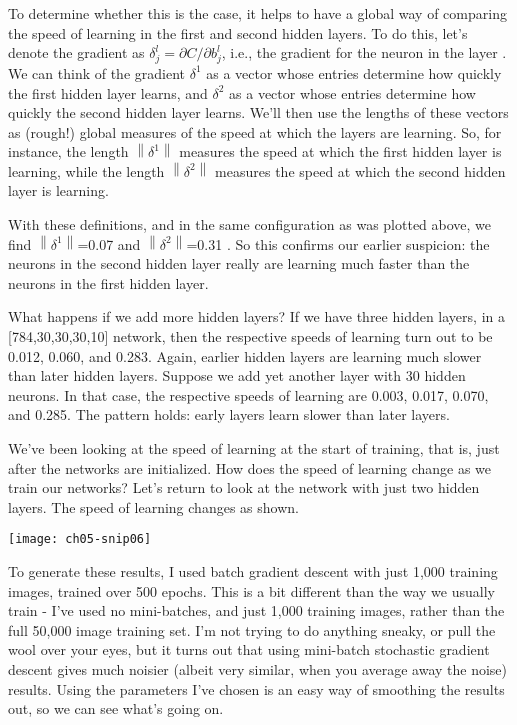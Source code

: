 To determine whether this is the case, it helps to have a global way of comparing the speed of learning in the first and second hidden layers. To do this, let's denote the gradient as $\delta_{j}^{l}=\partial C / \partial b_{j}^{l}$, i.e., the gradient for the  neuron in the  layer
. 
We can think of the gradient $\delta^{1}$ as a vector whose entries determine how quickly the first hidden layer learns, and $\delta^{2}$ as a vector whose entries determine how quickly the second hidden layer learns. We'll then use the lengths of these vectors as (rough!) global measures of the speed at which the layers are learning. So, for instance, the length $\left\|\delta^{1}\right\|$ measures the speed at which the first hidden layer is learning, while the length $\left\|\delta^{2}\right\|$ measures the speed at which the second hidden layer is learning.


With these definitions, and in the same configuration as was plotted above, we find $\left\|\delta^{1}\right\|$=0.07 and $\left\|\delta^{2}\right\|$=0.31 . So this confirms our earlier suspicion: the neurons in the second hidden layer really are learning much faster than the neurons in the first hidden layer.

What happens if we add more hidden layers? If we have three hidden layers, in a [784,30,30,30,10] network, then the respective speeds of learning turn out to be 0.012, 0.060, and 0.283. Again, earlier hidden layers are learning much slower than later hidden layers. Suppose we add yet another layer with 30 hidden neurons. In that case, the respective speeds of learning are 0.003, 0.017, 0.070, and 0.285. The pattern holds: early layers learn slower than later layers.

We've been looking at the speed of learning at the start of training, that is, just after the networks are initialized. How does the speed of learning change as we train our networks? Let's return to look at the network with just two hidden layers. The speed of learning changes as shown.
\begin{marginfigure}
    \texttt{[image: ch05-snip06]}
    \end{marginfigure}

To generate these results, I used batch gradient descent with just 1,000 training images, trained over 500 epochs. This is a bit different than the way we usually train - I've used no mini-batches, and just 1,000 training images, rather than the full 50,000 image training set. I'm not trying to do anything sneaky, or pull the wool over your eyes, but it turns out that using mini-batch stochastic gradient descent gives much noisier (albeit very similar, when you average away the noise) results. Using the parameters I've chosen is an easy way of smoothing the results out, so we can see what's going on.

